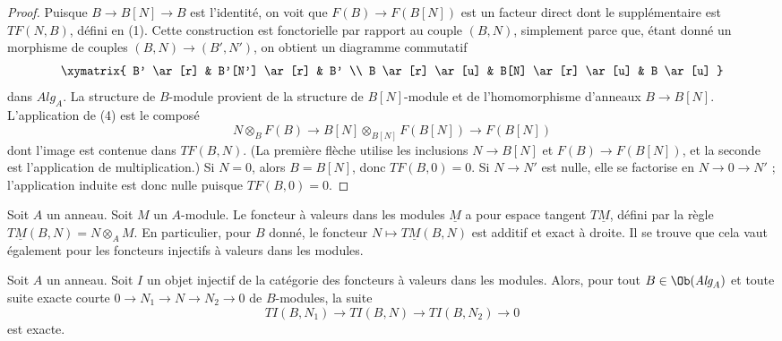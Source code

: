 \begin{proof}
Puisque $B \to B[N] \to B$ est l'identité, on voit que $F(B) \to F(B[N])$
est un facteur direct dont le supplémentaire est $TF(N, B)$, défini en (1).
Cette construction est fonctorielle par rapport au couple $(B, N)$, simplement parce que,
étant donné un morphisme de couples $(B, N) \to (B', N')$, on obtient un diagramme
commutatif
$$
\xymatrix{
B' \ar[r] & B'[N'] \ar[r] & B' \\
B \ar[r] \ar[u] & B[N] \ar[r] \ar[u] & B \ar[u]
}
$$
dans $\textit{Alg}_A$. La structure de $B$-module provient de la structure de $B[N]$-module
et de l'homomorphisme d'anneaux $B \to B[N]$. L'application de (4) est le
composé
$$
N \otimes_B F(B) \longrightarrow
B[N] \otimes_{B[N]} F(B[N]) \longrightarrow F(B[N])
$$
dont l'image est contenue dans $TF(B, N)$. (La première flèche utilise les inclusions
$N \to B[N]$ et $F(B) \to F(B[N])$, et la seconde est l'application
de multiplication.) Si $N = 0$, alors $B = B[N]$,
donc $TF(B, 0) = 0$. Si $N \to N'$ est nulle, elle se factorise en
$N \to 0 \to N'$ ; l'application induite est donc nulle puisque $TF(B, 0) = 0$.
\end{proof}

\noindent
Soit $A$ un anneau. Soit $M$ un $A$-module. Le foncteur à valeurs dans les modules
$\underline{M}$ a pour espace tangent $T\underline{M}$, défini par la règle
$T\underline{M}(B, N) = N \otimes_A M$. En particulier, pour $B$ donné, le
foncteur $N \mapsto T\underline{M}(B, N)$ est additif et exact à droite. Il se trouve
que cela vaut également pour les foncteurs injectifs à valeurs dans les modules.

\begin{lemma}
\label{lemma-tangent-injective}
Soit $A$ un anneau. Soit $I$ un objet injectif de la catégorie
des foncteurs à valeurs dans les modules. Alors, pour tout $B \in \Ob(\textit{Alg}_A)$
et toute suite exacte courte
$0 \to N_1 \to N \to N_2 \to 0$
de $B$-modules, la suite
$$
TI(B, N_1) \to TI(B, N) \to TI(B, N_2) \to 0
$$
est exacte.
\end{lemma}

